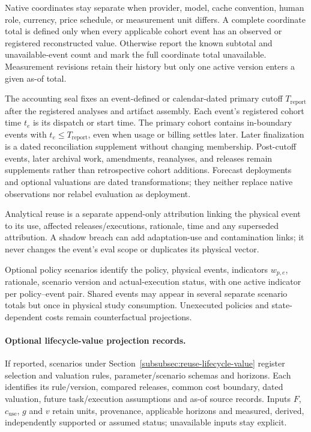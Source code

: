 \documentclass[10pt]{article} %
\providecommand{\1}{\mathbf{1}}  %
\theoremstyle{remark}
\theoremstyle{definition}
\begin{document}
Native coordinates stay separate when provider, model, cache convention,
human role, currency, price schedule, or measurement unit differs. A
complete coordinate total is defined only when every applicable cohort
event has an observed or registered reconstructed value. Otherwise
report the known subtotal and unavailable-event count and mark the full
coordinate total unavailable. Measurement revisions retain their history
but only one active version enters a given as-of total.

The accounting seal fixes an event-defined or calendar-dated primary cutoff
$T_{\mathrm{report}}$ after the registered analyses and artifact assembly.
Each event's registered cohort time $t_e$ is its dispatch or start time.
The primary cohort contains in-boundary events with
$t_e\leq T_{\mathrm{report}}$, even when usage or billing settles later.
Later finalization is a dated reconciliation supplement without changing
membership. Post-cutoff events, later archival work, amendments, reanalyses,
and releases remain supplements rather than retrospective cohort additions.
Forecast deployments and optional valuations are dated transformations;
they neither replace native observations nor relabel evaluation as deployment.

Analytical reuse is a separate append-only attribution linking the physical
event to its use, affected releases/executions, rationale, time and any
superseded attribution. A shadow breach can add adaptation-use and
contamination links; it never changes the event's eval scope or duplicates
its physical vector.

Optional policy scenarios identify the policy, physical events, indicators
$w_{p,e}$, rationale, scenario version and actual-execution status, with one
active indicator per policy--event pair. Shared events may appear in several
separate scenario totals but once in physical study consumption. Unexecuted
policies and state-dependent costs remain counterfactual projections.

\paragraph{Optional lifecycle-value projection records.}
If reported, scenarios under Section~\ref{subsubsec:reuse-lifecycle-value}
register selection and valuation rules, parameter/scenario schemas and
horizons. Each identifies its rule/version, compared releases, common cost
boundary, dated valuation, future task/execution assumptions and as-of source
records. Inputs $F$, $c_{\mathrm{use}}$, $g$ and $v$ retain units, provenance,
applicable horizons and measured, derived, independently supported or assumed
status; unavailable inputs stay explicit.
\end{document}
